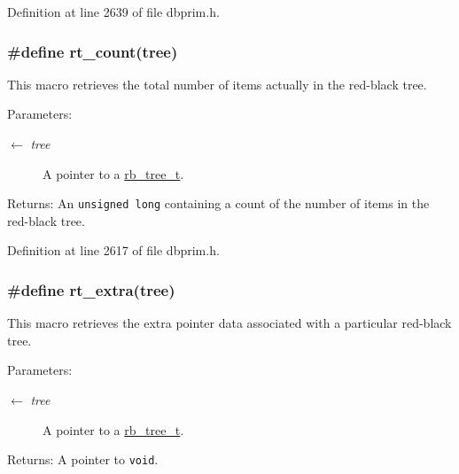 Definition at line 2639 of file dbprim.h.\hypertarget{group__dbprim__rbtree_ga21}{
\subsubsection[rt\_\-count]{\setlength{\rightskip}{0pt plus 5cm}\#define rt\_\-count(tree)}}
\label{group__dbprim__rbtree_ga21}


This macro retrieves the total number of items actually in the red-black tree.

\begin{Desc}
\item[Parameters:]
\begin{description}
\item[\mbox{$\leftarrow$} {\em tree}]A pointer to a \hyperlink{group__dbprim__rbtree_ga0}{rb\_\-tree\_\-t}.\end{description}
\end{Desc}
\begin{Desc}
\item[Returns:]An {\tt unsigned long} containing a count of the number of items in the red-black tree.\end{Desc}


Definition at line 2617 of file dbprim.h.\hypertarget{group__dbprim__rbtree_ga24}{
\subsubsection[rt\_\-extra]{\setlength{\rightskip}{0pt plus 5cm}\#define rt\_\-extra(tree)}}
\label{group__dbprim__rbtree_ga24}


This macro retrieves the extra pointer data associated with a particular red-black tree.

\begin{Desc}
\item[Parameters:]
\begin{description}
\item[\mbox{$\leftarrow$} {\em tree}]A pointer to a \hyperlink{group__dbprim__rbtree_ga0}{rb\_\-tree\_\-t}.\end{description}
\end{Desc}
\begin{Desc}
\item[Returns:]A pointer to {\tt void}.\end{Desc}


